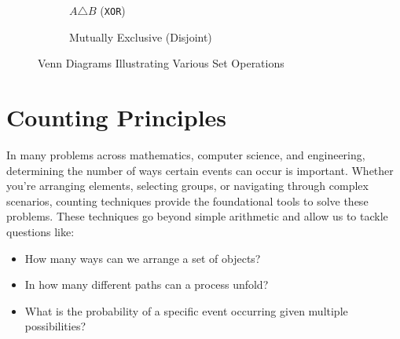 \begin{figure}[htbp]
\begin{subfigure}[b]{0.45\textwidth}
                \caption{$A \triangle B$ (\texttt{XOR})}
                \label{fig:venn_xor}
            \end{subfigure}
            
            \vspace{10pt} %
            \begin{subfigure}[b]{0.5\textwidth}
                \centering
                \caption{Mutually Exclusive (Disjoint)}
                \label{fig:venn6}
            \end{subfigure}
            \caption{Venn Diagrams Illustrating Various Set Operations}
            \label{fig:venn_diagrams}
        \end{figure}
        

\section{Counting Principles}

In many problems across mathematics, computer science, and engineering, determining the number of ways certain events can occur is important. Whether you're arranging elements, selecting groups, or navigating through complex scenarios, counting techniques provide the foundational tools to solve these problems. These techniques go beyond simple arithmetic and allow us to tackle questions like:

\begin{itemize}
    \item How many ways can we arrange a set of objects?
    \item In how many different paths can a process unfold?
    \item What is the probability of a specific event occurring given multiple possibilities?
\end{itemize}


